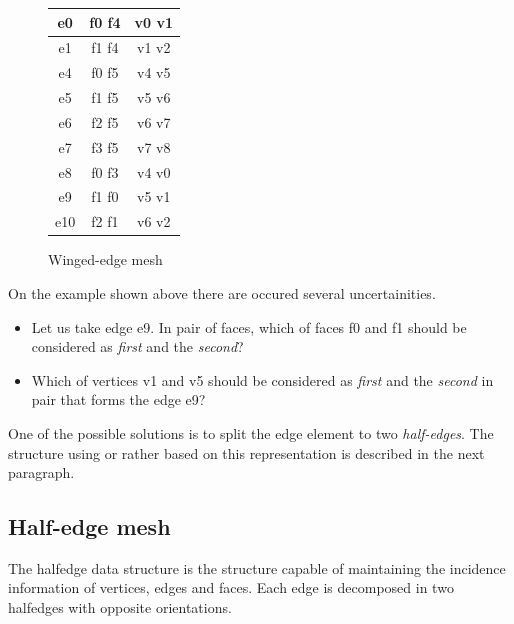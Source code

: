 \begin{figure}[h]
\begin{minipage}[hb]{0.25\linewidth}
\begin{tabular}{|c|c|c|}
\hline
\textsf{e0} & \textsf{f0 f4} & \textsf{v0 v1}\\
\hline
\textsf{e1} & \textsf{f1 f4} & \textsf{v1 v2}\\
\hline
\textsf{e4} & \textsf{f0 f5} & \textsf{v4 v5}\\
\hline
\textsf{e5} & \textsf{f1 f5} & \textsf{v5 v6}\\
\hline
\textsf{e6} & \textsf{f2 f5} & \textsf{v6 v7}\\
\hline
\textsf{e7} & \textsf{f3 f5} & \textsf{v7 v8}\\
\hline
\textsf{e8} & \textsf{f0 f3} & \textsf{v4 v0}\\
\hline
\textsf{e9} & \textsf{f1 f0} & \textsf{v5 v1}\\
\hline
\textsf{e10} & \textsf{f2 f1} & \textsf{v6 v2}\\
\hline
\end{tabular}

\label{fig:figure2}
\end{minipage}

\caption{Winged-edge mesh}
\end{figure}

On the example shown above there are occured several uncertainities.

\begin{itemize}
\item Let us take edge \textsf{e9}. In pair of faces, which of faces \textsf{f0} and 
\textsf{f1} should be considered as \emph{first} and the \emph{second}?

\item Which of vertices \textsf{v1} and \textsf{v5} should be considered as 
\emph{first} and the \emph{second} in pair that forms the edge \textsf{e9}?
\end{itemize}

One of the possible solutions is to split the edge element to two \emph{half-edges}.
The structure using or rather based on this representation is described in the next
paragraph.

\subsection{Half-edge mesh}

The halfedge data structure is the structure capable of maintaining the incidence
information of vertices, edges and faces. Each edge is decomposed in two halfedges
with opposite orientations.
\\

